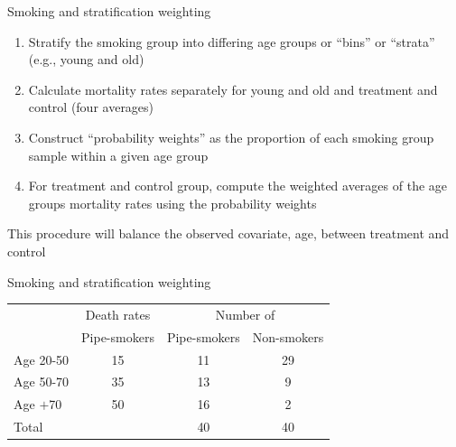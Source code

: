 \documentclass{beamer}
\begin{document}
\begin{frame}{Smoking and stratification weighting}

  \begin{enumerate}
		\item Stratify the smoking group into differing age groups or ``bins'' or ``strata'' (e.g., young and old)
		\item Calculate mortality rates separately for young and old and treatment and control (four averages)
		\item Construct ``probability weights'' as the proportion of each smoking group sample within a given age group
		\item For treatment and control group, compute the weighted averages of the age groups mortality rates using the probability weights
  \end{enumerate}
  
  \bigskip
  
This procedure will balance the observed covariate, age, between treatment and control

\end{frame}


\begin{frame}{Smoking and stratification weighting}
	


	\begin{table}\centering
		\begin{center}
		\begin{tabular}{lccc}
		\hline \hline
		\multicolumn{1}{l}{}&
		\multicolumn{1}{c}{Death rates}&
		\multicolumn{2}{c}{Number of}\\
		\multicolumn{1}{l}{}&
		\multicolumn{1}{c}{Pipe-smokers}&
		\multicolumn{1}{c}{Pipe-smokers}&
		\multicolumn{1}{c}{Non-smokers}\\
		\hline
		Age 20-50 & 15 & 11 & 29 \\
		Age 50-70 & 35 & 13 & 9 \\
		Age $+$70 & 50 & 16 & 2 \\
		Total & & 40 & 40 \\		
		\hline
		\end{tabular}
		\end{center}
	\end{table}
	
	\begin{flalign*}
    \\
     \\
     \\ 
    \\
	\end{flalign*}

\end{frame}
\end{document}
